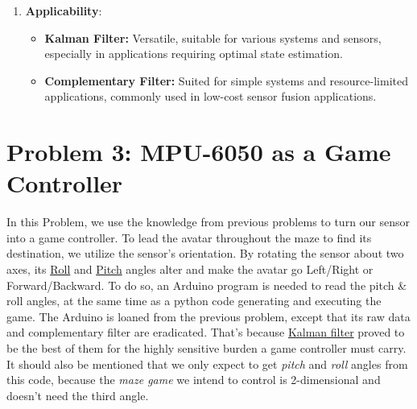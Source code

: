 \documentclass[conference]{IEEEtran}
\begin{document}
\begin{enumerate}
    \item \textbf{Applicability}:
          \begin{itemize}
              \item \textbf{Kalman Filter:} Versatile, suitable for various systems and sensors, especially in applications requiring optimal state estimation.
              \item \textbf{Complementary Filter:} Suited for simple systems and resource-limited applications, commonly used in low-cost sensor fusion applications.
          \end{itemize}
\end{enumerate}
\vspace{10px}





\section{Problem 3: MPU-6050 as a Game Controller}
In this Problem, we use the knowledge from previous problems to turn our sensor into a game controller. To lead the avatar throughout the maze to find its destination, we utilize the sensor's orientation. By rotating the sensor about two axes, its \underline{Roll} and \underline{Pitch} angles alter and make the avatar go Left/Right or Forward/Backward. To do so, an Arduino program is needed to read the pitch \& roll angles, at the same time as a python code generating and executing the game. The Arduino is loaned from the previous problem, except that its raw data and complementary filter are eradicated. That's because \underline{Kalman filter} proved to be the best of them for the highly sensitive burden a game controller must carry. It should also be mentioned that we only expect to get \textit{pitch} and \textit{roll} angles from this code, because the \textit{maze game} we intend to control is 2-dimensional and doesn't need the third angle.\\
\end{document}
